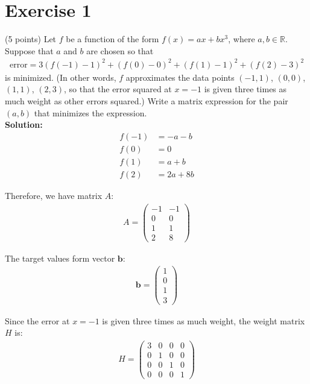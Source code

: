 \documentclass{article}
\begin{document}
\section*{Exercise 1}
(5 points) Let $f$ be a function of the form $f(x) = ax + bx^3$, where $a, b \in \mathbb{R}$. Suppose that $a$ and $b$ are chosen so that
\begin{align*}
\text{error} = 3(f(-1) - 1)^2 + (f(0) - 0)^2 + (f(1) - 1)^2 + (f(2) - 3)^2
\end{align*}
is minimized. (In other words, $f$ approximates the data points $(-1,1)$, $(0,0)$, $(1,1)$, $(2,3)$, so that the error squared at $x = -1$ is given three times as much weight as other errors squared.) Write a matrix expression for the pair $(a, b)$ that minimizes the  expression. \\

\textbf{Solution:}
\begin{align*}
f(-1) &= -a - b \\
f(0) &= 0 \\
f(1) &= a + b \\
f(2) &= 2a + 8b
\end{align*}

Therefore, we have matrix $A$:
\begin{align*}
A = \begin{pmatrix} 
-1 & -1 \\ 
0 & 0 \\ 
1 & 1 \\ 
2 & 8
\end{pmatrix}
\end{align*}

The target values form vector $\mathbf{b}$:
\begin{align*}
\mathbf{b} = \begin{pmatrix} 
1 \\ 
0 \\ 
1 \\ 
3
\end{pmatrix}
\end{align*}

Since the error at $x = -1$ is given three times as much weight, the weight matrix $H$ is:
\begin{align*}
H = \begin{pmatrix} 
3 & 0 & 0 & 0 \\ 
0 & 1 & 0 & 0 \\ 
0 & 0 & 1 & 0 \\ 
0 & 0 & 0 & 1
\end{pmatrix}
\end{align*}
\end{document}
